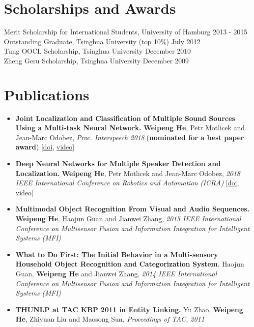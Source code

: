 \documentclass[a4paper,11pt]{article} %
\begin{document}
\section{Scholarships and Awards}

Merit Scholarship for International Students, University of Hamburg \hfill 2013 - 2015 \\
Outstanding Graduate, Tsinghua University (top 10\%) \hfill July 2012 \\
Tung OOCL Scholarship, Tsinghua University \hfill December 2010  \\
Zheng Geru Scholarship, Tsinghua University \hfill December 2009

\fi


\section{Publications}
\begin{itemize}
  \item \textbf{Joint Localization and Classification of Multiple Sound Sources Using a Multi-task Neural Network.}
    \textbf{Weipeng He}, Petr Motlicek and Jean-Marc Odobez,
    \textit{Proc. Interspeech 2018}
    (\textbf{nominated for a best paper award})
    [\href{http://doi.org/10.21437/Interspeech.2018-1269}{doi}, \href{https://www.youtube.com/watch?v=O7bQvg03RTc}{video}]

  \item \textbf{Deep Neural Networks for Multiple Speaker Detection and Localization.}
    \textbf{Weipeng He}, Petr Motlicek and Jean-Marc Odobez,
    \textit{2018 IEEE International Conference on Robotics and Automation (ICRA)}
    [\href{http://doi.org/10.1109/ICRA.2018.8461267}{doi}, \href{https://www.youtube.com/watch?v=_4EwuVlE_pU}{video}]

  \item \textbf{Multimodal Object Recognition From Visual and Audio Sequences.}
    \textbf{Weipeng He}, Haojun Guan and Jianwei Zhang,
    \textit{2015 IEEE International Conference on Multisensor Fusion and Information Integration for Intelligent Systems (MFI)}

  \item \textbf{What to Do First: The Initial Behavior in a Multi-sensory Household Object Recognition and Categorization System.}
    Haojun Guan, \textbf{Weipeng He} and Jianwei Zhang,
    \textit{2014 IEEE International Conference on Multisensor Fusion and Information Integration for Intelligent Systems (MFI)}

  \item \textbf{THUNLP at TAC KBP 2011 in Entity Linking.}
    Yu Zhao, \textbf{Weipeng He}, Zhiyuan Liu and Maosong Sun,
    \textit{Proceedings of TAC, 2011}
\end{itemize}
\end{document}
